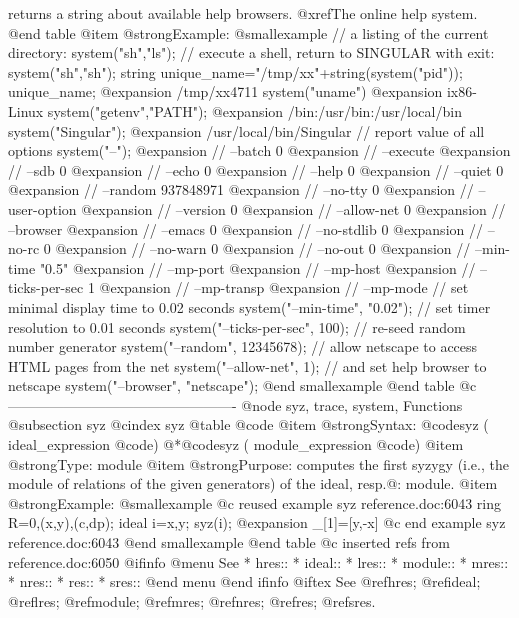 {{{{{{{returns a string about available help browsers.
@xref{The online help system}.
@end table
@item @strong{Example:}
@smallexample
// a listing of the current directory:
system("sh","ls");
// execute a shell, return to SINGULAR with exit:
system("sh","sh");
string unique_name="/tmp/xx"+string(system("pid"));
unique_name;
@expansion{} /tmp/xx4711
system("uname")
@expansion{} ix86-Linux
system("getenv","PATH");
@expansion{} /bin:/usr/bin:/usr/local/bin
system("Singular");
@expansion{} /usr/local/bin/Singular
// report value of all options
system("--");
@expansion{} // --batch           0
@expansion{} // --execute
@expansion{} // --sdb             0
@expansion{} // --echo            0
@expansion{} // --help            0
@expansion{} // --quiet           0
@expansion{} // --random          937848971
@expansion{} // --no-tty          0
@expansion{} // --user-option
@expansion{} // --version         0
@expansion{} // --allow-net       0
@expansion{} // --browser
@expansion{} // --emacs           0
@expansion{} // --no-stdlib       0
@expansion{} // --no-rc           0
@expansion{} // --no-warn         0
@expansion{} // --no-out          0
@expansion{} // --min-time        "0.5"
@expansion{} // --mp-port
@expansion{} // --mp-host
@expansion{} // --ticks-per-sec   1
@expansion{} // --mp-transp
@expansion{} // --mp-mode
// set minimal display time to 0.02 seconds
system("--min-time", "0.02");
// set timer resolution to 0.01 seconds
system("--ticks-per-sec", 100);
// re-seed random number generator
system("--random", 12345678);
// allow netscape to access HTML pages from the net
system("--allow-net", 1);
// and set help browser to netscape
system("--browser", "netscape");
@end smallexample
@end table
@c -------------------------------------------------
@node syz, trace, system, Functions
@subsection syz
@cindex syz
@table @code
@item @strong{Syntax:}
@code{syz (} ideal_expression @code{)}
@*@code{syz (} module_expression @code{)}
@item @strong{Type:}
module
@item @strong{Purpose:}
computes the first syzygy (i.e., the module of relations of the given
generators) of the ideal, resp.@: module.
@item @strong{Example:}
@smallexample
@c reused example syz reference.doc:6043 
  ring R=0,(x,y),(c,dp);
  ideal i=x,y;
  syz(i);
@expansion{} _[1]=[y,-x]
@c end example syz reference.doc:6043
@end smallexample
@end table
@c inserted refs from reference.doc:6050
@ifinfo
@menu
See
* hres::
* ideal::
* lres::
* module::
* mres::
* nres::
* res::
* sres::
@end menu
@end ifinfo
@iftex
See
@ref{hres};
@ref{ideal};
@ref{lres};
@ref{module};
@ref{mres};
@ref{nres};
@ref{res};
@ref{sres}.
}}}}}}}
